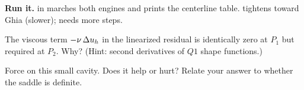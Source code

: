 \begin{runbox}\textbf{Run it.}  in
 marches both engines and prints the centerline
table.  tightens toward Ghia (slower); 
needs more steps.\end{runbox}

\question The viscous term $-\nu\,\Delta u_h$ in the linearized residual is
identically zero at $P_1$ but required at $P_2$. Why? (Hint: second
derivatives of $Q1$ shape functions.)

\question Force  on this small cavity. Does it help or
hurt? Relate your answer to whether the saddle is definite.
